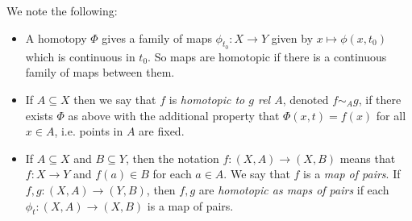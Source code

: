 \begin{remark}
  We note the following:
  \begin{itemize}
    \item A homotopy $\Phi$ gives a family of maps
      $\phi_{t_0} : X \to Y$ given by
      $x \mapsto \phi(x, t_0)$ which is continuous
      in $t_0$. So maps are homotopic if there is a
      continuous family of maps between them.
    \item If $A \subseteq X$ then we say that
      $f$ is \emph{homotopic to $g$ rel $A$},
      denoted $f \sim_A g$, if there exists
      $\Phi$ as above with the additional property
      that $\Phi(x, t) = f(x)$ for all $x \in A$,
      i.e. points in $A$ are fixed.
    \item If $A \subseteq X$ and $B \subseteq Y$,
      then the notation $f : (X, A) \to (X, B)$
      means that $f : X \to Y$ and
      $f(a) \in B$ for each $a \in A$.
      We say that $f$ is a \emph{map of pairs}.
      If $f, g : (X, A) \to (Y, B)$, then $f, g$
      are \emph{homotopic as maps of pairs} if each
      $\phi_t : (X, A) \to (X, B)$ is a map of pairs.
  \end{itemize}
\end{remark}

